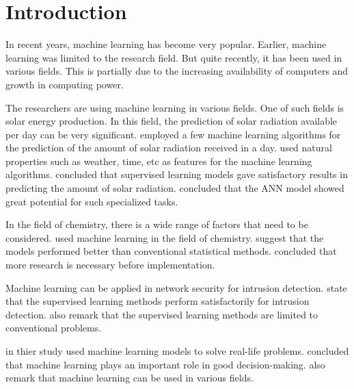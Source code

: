 \documentclass[a4paper,fleqn]{cas-dc}
\begin{document}

\maketitle



\section{Introduction}\label{sec:introduciton}

In recent years, machine learning has become very popular. Earlier, machine learning was limited to the research field. But quite recently, it has been used in various fields. This is partially due to the increasing availability of computers and growth in computing power.

The researchers are using machine learning in various fields. One of such fields is solar energy production. In this field, the prediction of solar radiation available per day can be very significant. \cite*{ref_paper_7} employed a few machine learning algorithms for the prediction of the amount of solar radiation received in a day. \citeauthor{ref_paper_7} used natural properties such as weather, time, etc as features for the machine learning algorithms. \citeauthor{ref_paper_7} concluded that supervised learning models gave satisfactory results in predicting the amount of solar radiation. \citeauthor{ref_paper_7} concluded that the ANN model showed great potential for such specialized tasks.

In the field of chemistry, there is a wide range of factors that need to be considered. \cite*{ref_paper_10} used machine learning in the field of chemistry. \citeauthor{ref_paper_10} suggest that the models performed better than conventional statistical methods. \citeauthor{ref_paper_10} concluded that more research is necessary before implementation.

Machine learning can be applied in network security for intrusion detection. \cite*{ref_paper_21} state that the supervised learning methods perform satisfactorily for intrusion detection. \citeauthor{ref_paper_21} also remark that the supervised learning methods are limited to conventional problems.

\cite*{ref_paper_36} in thier study used machine learning models to solve real-life problems. \citeauthor{ref_paper_36} concluded that machine learning plays an important role in good decision-making. \citeauthor{ref_paper_36} also remark that machine learning can be used in various fields.
\end{document}
